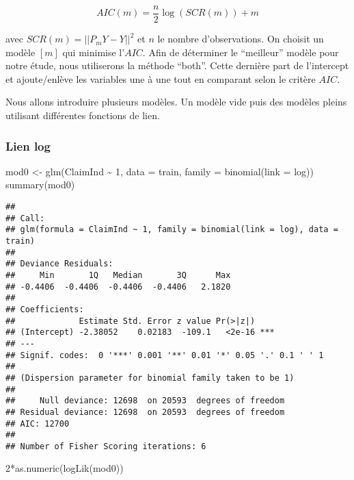\documentclass[
]{article}
\newenvironment{Shaded}{\begin{snugshade}}{\end{snugshade}}
\newcommand{\AttributeTok}[1]{\textcolor[rgb]{0.77,0.63,0.00}{#1}}
\newcommand{\DecValTok}[1]{\textcolor[rgb]{0.00,0.00,0.81}{#1}}
\newcommand{\FunctionTok}[1]{\textcolor[rgb]{0.00,0.00,0.00}{#1}}
\newcommand{\NormalTok}[1]{#1}
\newcommand{\OtherTok}[1]{\textcolor[rgb]{0.56,0.35,0.01}{#1}}
\newcommand{\SpecialCharTok}[1]{\textcolor[rgb]{0.00,0.00,0.00}{#1}}
\begin{document}
\[
AIC(m)=\frac{n}{2}\log(SCR(m))+m
\]

avec \(SCR(m)=||P_mY-Y||^2\) et \(n\) le nombre d'observations. On
choisit un modèle \([m]\) qui minimise l'\(AIC\). Afin de déterminer le
``meilleur'' modèle pour notre étude, nous utiliserons la méthode
``both''. Cette dernière part de l'intercept et ajoute/enlève les
variables une à une tout en comparant selon le critère \(AIC\).

Nous allons introduire plusieurs modèles. Un modèle vide puis des
modèles pleins utilisant différentes fonctions de lien.

\hypertarget{lien-log}{%
\subsubsection{Lien log}\label{lien-log}}

\begin{Shaded}
\begin{Highlighting}[]
\NormalTok{mod0 }\OtherTok{\textless{}{-}} \FunctionTok{glm}\NormalTok{(ClaimInd }\SpecialCharTok{\textasciitilde{}} \DecValTok{1}\NormalTok{, }\AttributeTok{data =}\NormalTok{ train, }\AttributeTok{family =} \FunctionTok{binomial}\NormalTok{(}\AttributeTok{link =}\NormalTok{ log))}
\FunctionTok{summary}\NormalTok{(mod0)}
\end{Highlighting}
\end{Shaded}

\begin{verbatim}
## 
## Call:
## glm(formula = ClaimInd ~ 1, family = binomial(link = log), data = train)
## 
## Deviance Residuals: 
##     Min       1Q   Median       3Q      Max  
## -0.4406  -0.4406  -0.4406  -0.4406   2.1820  
## 
## Coefficients:
##             Estimate Std. Error z value Pr(>|z|)    
## (Intercept) -2.38052    0.02183  -109.1   <2e-16 ***
## ---
## Signif. codes:  0 '***' 0.001 '**' 0.01 '*' 0.05 '.' 0.1 ' ' 1
## 
## (Dispersion parameter for binomial family taken to be 1)
## 
##     Null deviance: 12698  on 20593  degrees of freedom
## Residual deviance: 12698  on 20593  degrees of freedom
## AIC: 12700
## 
## Number of Fisher Scoring iterations: 6
\end{verbatim}

\begin{Shaded}
\begin{Highlighting}[]
\DecValTok{2}\SpecialCharTok{*}\FunctionTok{as.numeric}\NormalTok{(}\FunctionTok{logLik}\NormalTok{(mod0))}
\end{Highlighting}
\end{Shaded}
\end{document}
